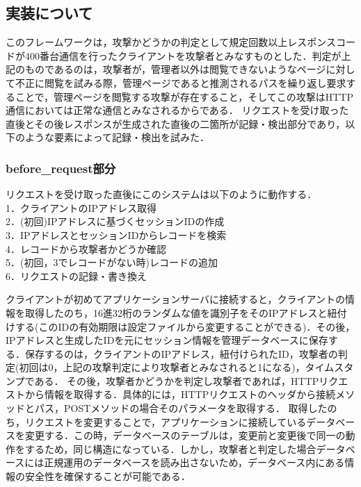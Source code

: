 \documentclass{css}
\begin{document}
\subsection{実装について}
このフレームワークは，攻撃かどうかの判定として規定回数以上レスポンスコードが400番台通信を行ったクライアントを攻撃者とみなすものとした．判定が上記のものであるのは，攻撃者が，管理者以外は閲覧できないようなページに対して不正に閲覧を試みる際，管理ページであると推測されるパスを繰り返し要求することで，管理ページを閲覧する攻撃が存在すること，そしてこの攻撃はHTTP通信においては正常な通信とみなされるからである．
リクエストを受け取った直後とその後レスポンスが生成された直後の二箇所が記録・検出部分であり，以下のような要素によって記録・検出を試みた．

\subsubsection{before\_request部分}
リクエストを受け取った直後にこのシステムは以下のように動作する．\\
1．クライアントのIPアドレス取得\\
2．(初回)IPアドレスに基づくセッションIDの作成\\
3．IPアドレスとセッションIDからレコードを検索\\
4．レコードから攻撃者かどうか確認\\
5．(初回，3でレコードがない時)レコードの追加\\
6．リクエストの記録・書き換え\par
クライアントが初めてアプリケーションサーバに接続すると，クライアントの情報を取得したのち，16進32桁のランダムな値を識別子をそのIPアドレスと紐付けする(このIDの有効期限は設定ファイルから変更することができる)．その後，IPアドレスと生成したIDを元にセッション情報を管理データベースに保存する．保存するのは，クライアントのIPアドレス，紐付けられたID，攻撃者の判定(初回は0，上記の攻撃判定により攻撃者とみなされると1になる)，タイムスタンプである．
その後，攻撃者かどうかを判定し攻撃者であれば，HTTPリクエストから情報を取得する．具体的には，HTTPリクエストのヘッダから接続メソッドとパス，POSTメソッドの場合そのパラメータを取得する．
取得したのち，リクエストを変更することで，アプリケーションに接続しているデータベースを変更する．この時，データベースのテーブルは，変更前と変更後で同一の動作をするため，同じ構造になっている．しかし，攻撃者と判定した場合データベースには正規運用のデータベースを読み出さないため，データベース内にある情報の安全性を確保することが可能である．
\end{document}
